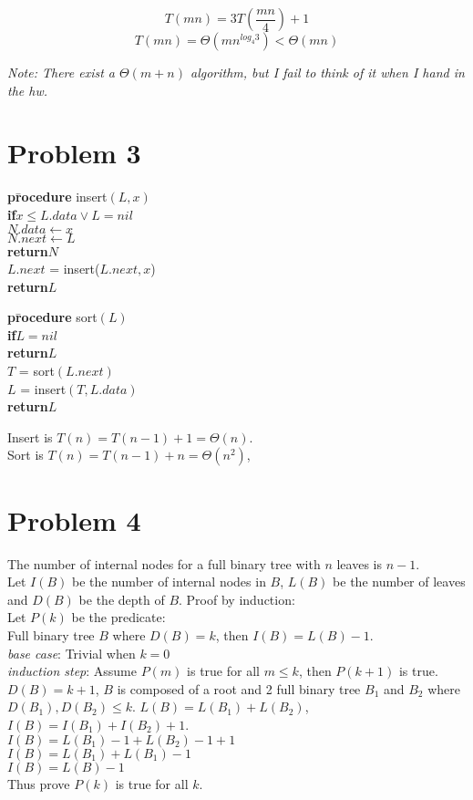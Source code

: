 \documentclass[letter]{article}
\newcommand{\aprocedure}{\textbf{pr}\=\+\textbf{ocedure}\xspace}
\newcommand{\aif}{\textbf{if}\=\+\xspace}
\newcommand{\aend}{\-\kill}
\newcommand{\areturn}{\textbf{return}\xspace}
\begin{document}
\[T(mn) = 3T(\frac{mn}{4}) + 1\]
\[T(mn) = \Theta(mn^{log_4 3}) < \Theta(mn)\]

\emph{Note: There exist a $\Theta(m+n)$ algorithm, but I fail to think of it when I hand in the hw.}
\section*{Problem 3}
\begin{tabbing}
\aprocedure insert$(L,x)$\\
\aif $x \leq L.data \vee L = nil$\\
$N.data \gets x$\\
$N.next \gets L$\\
\areturn $N$\\
\aend
$L.next$ = insert($L.next,x$)\\
\areturn $L$
\end{tabbing}

\begin{tabbing}
\aprocedure sort$(L)$\\
\aif $L = nil$\\
\areturn $L$\\
\aend
$T$ = sort$(L.next)$\\
$L$ = insert$(T,L.data)$\\
\areturn $L$
\end{tabbing}

Insert is $T(n) = T(n-1) + 1 = \Theta(n)$.\\
Sort is $T(n) = T(n-1) + n=\Theta(n^2)$,

\section*{Problem 4}
The number of internal nodes for a full binary tree with $n$ leaves is $n-1$.\\
Let $I(B)$ be the number of internal nodes in $B$, $L(B)$ be the number of leaves and $D(B)$ be the depth of $B$.
Proof by induction:\\
Let $P(k)$ be the predicate:\\
Full binary tree $B$ where $D(B) = k$, then $I(B) = L(B)-1$.\\
\emph{base case}: Trivial when $k = 0$\\
\emph{induction step}: Assume $P(m)$ is true for all $m\leq k$, then $P(k+1)$ is true.\\
$D(B) = k+1$, $B$ is composed of a root and 2 full binary tree $B_1$ and $B_2$ where $D(B_1), D(B_2) \leq k$.
$L(B) = L(B_1) + L(B_2)$, $I(B) = I(B_1) + I(B_2) + 1$.\\
$I(B) = L(B_1) -1 + L(B_2) -1 + 1$\\
$I(B) = L(B_1) + L(B_1) -1$\\
$I(B) = L(B) -1$\\
Thus prove $P(k)$ is true for all $k$.
\end{document}
